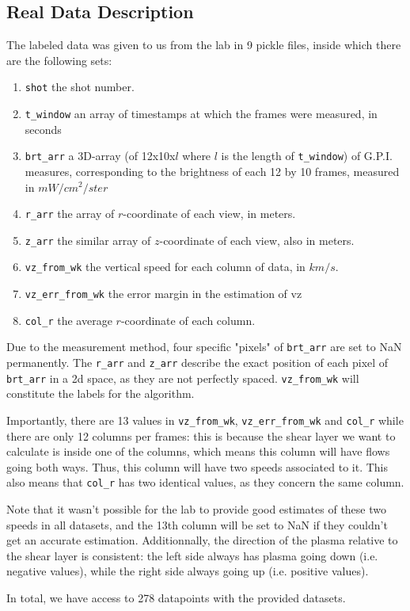 \documentclass[10pt,conference]{IEEEtran}
\begin{document}
\subsection{Real Data Description}
The labeled data was given to us from the lab in 9 pickle files, inside which there are the following sets:
\begin{enumerate}
  \item \texttt{shot} the shot number.
  \item \texttt{t\_window} an array of timestamps at which the frames were measured, in seconds
  \item \texttt{brt\_arr} a 3D-array (of 12x10x$l$ where $l$ is the length of \texttt{t\_window}) of G.P.I. measures, corresponding to the brightness of each 12 by 10 frames, measured in $mW/cm^2/ster$
  \item \texttt{r\_arr} the array of $r$-coordinate of each view, in meters.
  \item \texttt{z\_arr} the similar array of $z$-coordinate of each view, also in meters.
  \item \texttt{vz\_from\_wk} the vertical speed for each column of data, in $km/s$.
  \item \texttt{vz\_err\_from\_wk} the error margin in the estimation of vz
  \item \texttt{col\_r} the average $r$-coordinate of each column.
\end{enumerate}
Due to the measurement method, four specific "pixels" of \texttt{brt\_arr} are set to NaN permanently. The \texttt{r\_arr} and \texttt{z\_arr} describe the exact position of each pixel of \texttt{brt\_arr} in a 2d space, as they are not perfectly spaced. \texttt{vz\_from\_wk} will constitute the labels for the algorithm.\par
Importantly, there are 13 values in \texttt{vz\_from\_wk}, \texttt{vz\_err\_from\_wk} and \texttt{col\_r} while there are only 12 columns per frames: this is because the shear layer we want to calculate is inside one of the columns, which means this column will have flows going both ways. Thus, this column will have two speeds associated to it. This also means that \texttt{col\_r} has two identical values, as they concern the same column.\par
Note that it wasn't possible for the lab to provide good estimates of these two speeds in all datasets, and the 13th column will be set to NaN if they couldn't get an accurate estimation. 
Additionnally, the direction of the plasma relative to the shear layer is consistent: the left side always has plasma going down (i.e. negative values), while the right side always going up (i.e. positive values). \par
In total, we have access to 278 datapoints with the provided datasets.
\end{document}
